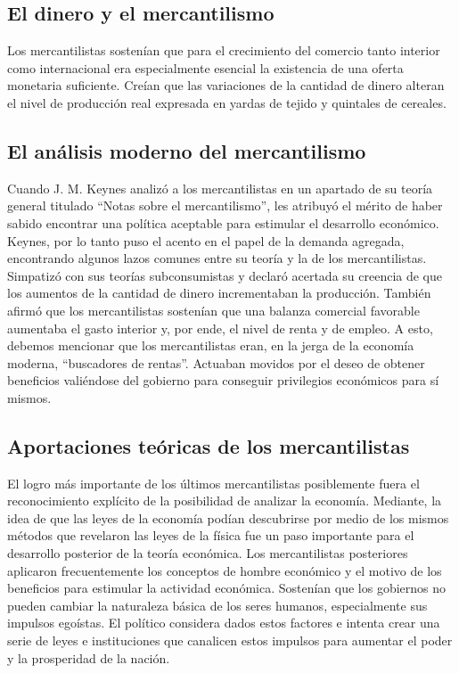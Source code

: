 \documentclass[10pt]{book}
\begin{document}
\subsection{El dinero y el mercantilismo}
Los mercantilistas sostenían que para el crecimiento del comercio tanto interior como internacional era especialmente esencial la existencia de una oferta monetaria suficiente. Creían que las variaciones de la cantidad de dinero alteran el nivel de producción real expresada en yardas de tejido y quintales de cereales.

\subsection{El análisis moderno del mercantilismo}
Cuando J. M. Keynes analizó a los mercantilistas en un apartado de su teoría general titulado “Notas sobre el mercantilismo”, les atribuyó el mérito de haber sabido encontrar una política aceptable para estimular el desarrollo económico. Keynes, por lo tanto puso el acento en el papel de la demanda agregada, encontrando algunos lazos comunes entre su teoría y la de los mercantilistas. Simpatizó con sus teorías subconsumistas y declaró acertada su creencia de que los aumentos de la cantidad de dinero incrementaban la producción. También afirmó que los mercantilistas sostenían que una balanza comercial favorable aumentaba el gasto interior y, por ende, el nivel de renta y de empleo. A esto, debemos mencionar que los mercantilistas eran, en la jerga de la economía moderna, “buscadores de rentas”. Actuaban movidos por el deseo de obtener beneficios valiéndose del gobierno para conseguir privilegios económicos para sí mismos.

\subsection{Aportaciones teóricas de los mercantilistas}
El logro más importante de los últimos mercantilistas posiblemente fuera el reconocimiento explícito de la posibilidad de analizar la economía. Mediante, la idea de que las leyes de la economía podían descubrirse por medio de los mismos métodos que revelaron las leyes de la física fue un paso importante para el desarrollo posterior de la teoría económica. Los mercantilistas posteriores aplicaron frecuentemente los conceptos de hombre económico y el motivo de los beneficios para estimular la actividad económica. Sostenían que los gobiernos no pueden cambiar la naturaleza básica de los seres humanos, especialmente sus impulsos egoístas. El político considera dados estos factores e intenta crear una serie de leyes e instituciones que canalicen estos impulsos para aumentar el poder y la prosperidad de la nación.\\
\end{document}
